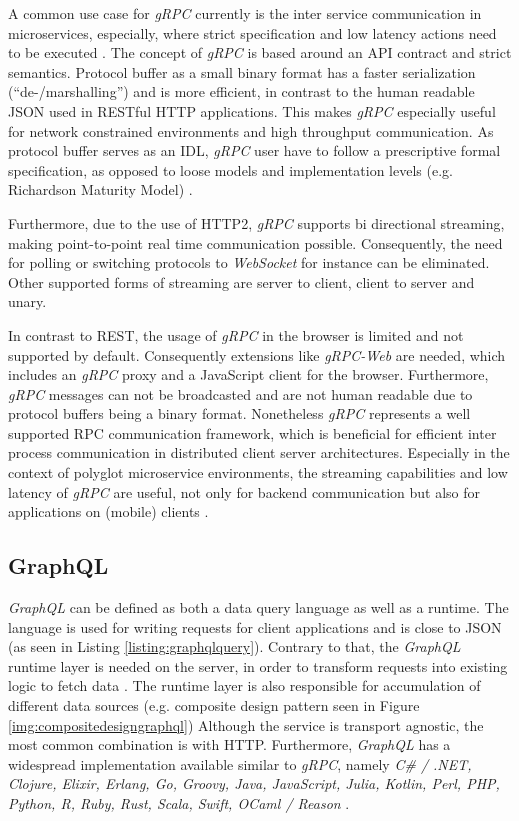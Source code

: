 A common use case for \textit{gRPC} currently is the inter service communication in microservices, especially, where strict specification and low latency actions need to be executed \cite{Sturgeon.2016}.
The concept of \textit{gRPC} is based around an API contract and strict semantics.
Protocol buffer as a small binary format has a faster serialization (\enquote{de-/marshalling}) and is more efficient, in contrast to the human readable \ac{JSON} used in RESTful \ac{HTTP} applications.
This makes \textit{gRPC} especially useful for network constrained environments and high throughput communication.
As protocol buffer serves as an \ac{IDL}, \textit{gRPC} user have to follow a prescriptive formal specification, as opposed to loose models and implementation levels (e.g. Richardson Maturity Model) \cite{NewtonKing.2019}.

Furthermore, due to the use of HTTP2, \textit{gRPC} supports bi directional streaming, making point-to-point real time communication possible.
Consequently, the need for polling or switching protocols to \textit{WebSocket} for instance can be eliminated.
Other supported forms of streaming are server to client, client to server and unary.

In contrast to \ac{REST}, the usage of \textit{gRPC} in the browser is limited and not supported by default.
Consequently extensions like \textit{gRPC-Web} are needed, which includes an \textit{gRPC} proxy and a JavaScript client for the browser.
Furthermore, \textit{gRPC} messages can not be broadcasted and are not human readable due to protocol buffers being a binary format.
Nonetheless \textit{gRPC} represents a well supported \ac{RPC} communication framework, which is beneficial for efficient inter process communication in distributed client server architectures.
Especially in the context of polyglot microservice environments, the streaming capabilities and low latency of \textit{gRPC} are useful, not only for backend communication but also for applications on (mobile) clients \cite{NewtonKing.2019}\cite{1&1IONOSSE.2020}.

\subsection{GraphQL}\label{cha:Technologies:communication:graphql}

\textit{GraphQL} can be defined as both a data query language as well as a runtime.
The language is used for writing requests for client applications and is close to
\ac{JSON} (as seen in Listing \ref{listing:graphqlquery}).
Contrary to that, the \textit{GraphQL} runtime layer is needed on the server, in order to transform requests into existing logic to fetch data \cite[p.7~f.]{Buna.2016}.
The runtime layer is also responsible for accumulation of different data sources (e.g. composite design pattern seen in Figure \ref{img:compositedesigngraphql})
Although the service is transport agnostic, the most common combination is with \ac{HTTP}.
Furthermore, \textit{GraphQL} has a widespread implementation available similar to \textit{gRPC}, namely \textit{C\# / .NET, Clojure, Elixir, Erlang, Go, Groovy, Java, JavaScript, Julia, Kotlin, Perl, PHP, Python, R, Ruby, Rust, Scala, Swift, OCaml / Reason} \cite{TheGraphQLFoundation.27.05.2020}.

